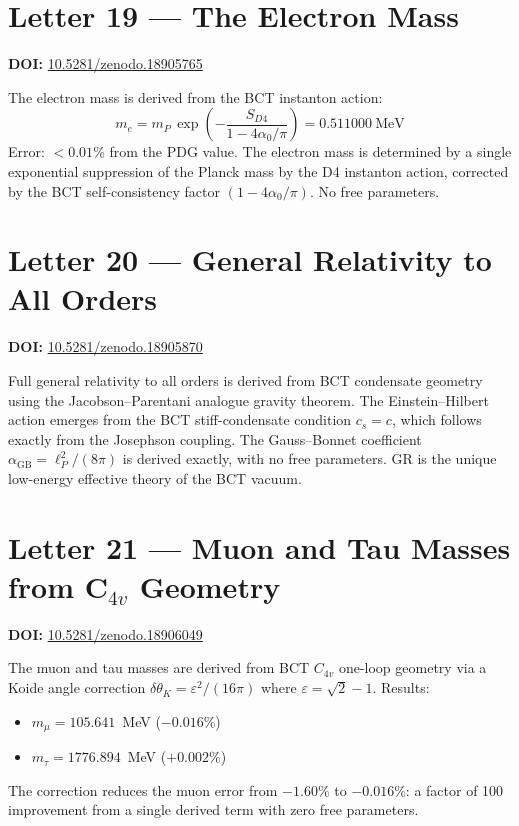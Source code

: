 \documentclass[aps,prl,twocolumn,showpacs,preprintnumbers]{revtex4-2}
\begin{document}
\section{Letter 19 --- The Electron Mass}
\noindent\textbf{DOI:} \href{https://doi.org/10.5281/zenodo.18905765}{10.5281/zenodo.18905765}

\medskip
The electron mass is derived from the BCT instanton action:
\begin{equation}
m_e = m_P\,\exp\!\left(-\frac{S_{D4}}{1-4\alpha_0/\pi}\right)
= 0.511000~\mathrm{MeV}
\end{equation}
Error: $<0.01\%$ from the PDG value. The electron mass is determined
by a single exponential suppression of the Planck mass by the D4
instanton action, corrected by the BCT self-consistency factor
$(1-4\alpha_0/\pi)$. No free parameters.

\section{Letter 20 --- General Relativity to All Orders}
\noindent\textbf{DOI:} \href{https://doi.org/10.5281/zenodo.18905870}{10.5281/zenodo.18905870}

\medskip
Full general relativity to all orders is derived from BCT condensate
geometry using the Jacobson--Parentani analogue gravity theorem.
The Einstein--Hilbert action emerges from the BCT stiff-condensate
condition $c_s = c$, which follows exactly from the Josephson coupling.
The Gauss--Bonnet coefficient $\alpha_{\mathrm{GB}} = \ell_P^2/(8\pi)$
is derived exactly, with no free parameters. GR is the unique
low-energy effective theory of the BCT vacuum.

\section{Letter 21 --- Muon and Tau Masses from C$_{4v}$ Geometry}
\noindent\textbf{DOI:} \href{https://doi.org/10.5281/zenodo.18906049}{10.5281/zenodo.18906049}

\medskip
The muon and tau masses are derived from BCT $C_{4v}$ one-loop geometry
via a Koide angle correction $\delta\theta_K = \varepsilon^2/(16\pi)$
where $\varepsilon = \sqrt{2}-1$. Results:
\begin{itemize}
  \item $m_\mu = 105.641$~MeV ($-0.016\%$)
  \item $m_\tau = 1776.894$~MeV ($+0.002\%$)
\end{itemize}
The correction reduces the muon error from $-1.60\%$ to $-0.016\%$:
a factor of 100 improvement from a single derived term with zero
free parameters.
\end{document}
